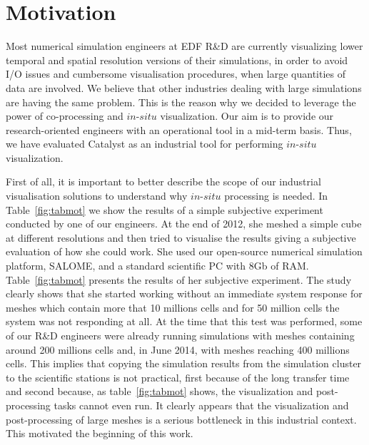 \section{Motivation}
\label{sec:motivation}

Most numerical simulation engineers at EDF R\&D are currently visualizing lower
temporal and spatial resolution versions of their simulations, in order to avoid
I/O issues and cumbersome visualisation procedures, when large quantities of
data are involved. We believe that other industries dealing with large
simulations are having the same problem. This is the reason why we decided to
leverage the power of co-processing and $in$-$situ$ visualization. Our aim is to
provide our research-oriented engineers with an operational tool in a mid-term
basis. Thus, we have evaluated Catalyst as an industrial tool for performing
$in$-$situ$ visualization. 

First of all, it is important to better describe the scope of our industrial
visualisation solutions to understand why $in$-$situ$ processing is needed. In
Table~\ref{fig:tabmot} we show the results of a simple subjective experiment 
conducted by one of our engineers. At the end of 2012, she meshed 
a simple cube at different resolutions and then tried to visualise the results 
giving a subjective evaluation of how she could work. She used  
our open-source numerical simulation platform, SALOME,
and a standard scientific PC with 8Gb of RAM. Table~\ref{fig:tabmot} presents
the results of her subjective experiment. The study clearly shows that she
started working without an immediate system response for meshes which contain
more that 10 millions cells and for 50 million cells the system was not
responding at all. At the time that this test was performed, some of our R\&D engineers
were already running simulations with meshes containing around 200 millions cells and, 
in June 2014, with meshes reaching 400 millions cells. This implies that copying the
simulation results from the simulation cluster to the scientific stations is not practical, first
because of the long transfer time and second because, as table~\ref{fig:tabmot} shows,
the visualization and post-processing tasks cannot even run. 
It clearly appears that the visualization and post-processing of large meshes is
a serious bottleneck in this industrial context. This motivated the beginning of this work.

